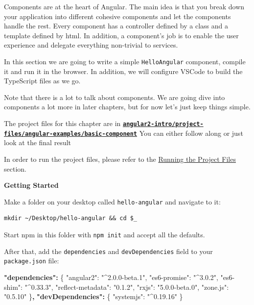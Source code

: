 \documentclass[12pt,]{article}
\newenvironment{Shaded}{}{}
\newcommand{\DataTypeTok}[1]{{#1}}
\newcommand{\StringTok}[1]{\textcolor[rgb]{0.00,0.50,0.50}{{#1}}}
\newcommand{\FunctionTok}[1]{{#1}}
\newcommand{\ErrorTok}[1]{\textcolor[rgb]{1.00,0.00,0.00}{\textbf{{#1}}}}
\begin{document}
Components are at the heart of Angular. The main idea is that you break
down your application into different cohesive components and let the
components handle the rest. Every component has a controller defined by
a class and a template defined by html. In addition, a component's job
is to enable the user experience and delegate everything non-trivial to
services.

In this section we are going to write a simple \texttt{HelloAngular}
component, compile it and run it in the browser. In addition, we will
configure VSCode to build the TypeScript files as we go.

Note that there is a lot to talk about components. We are going dive
into components a lot more in later chapters, but for now let's just
keep things simple.

The project files for this chapter are in
\textbf{\href{https://github.com/st32lth/angular2-intro/tree/master/project-files/angular-examples/basic-component}{\texttt{angular2-intro/project-files/angular-examples/basic-component}}}
You can either follow along or just look at the final result

In order to run the project files, please refer to the
\protect\hyperlink{running-the-project-files}{Running the Project Files}
section.

\textbf{Getting Started}

Make a folder on your desktop called \texttt{hello-angular} and navigate
to it:

\begin{verbatim}
mkdir ~/Desktop/hello-angular && cd $_
\end{verbatim}

Start npm in this folder with \texttt{npm\ init} and accept all the
defaults.

After that, add the \texttt{dependencies} and \texttt{devDependencies}
field to your \texttt{package.json} file:

\begin{Shaded}
\begin{Highlighting}[numbers=left,,]
\ErrorTok{"dependencies":} \FunctionTok{\{}
  \DataTypeTok{"angular2"}\FunctionTok{:} \StringTok{"^2.0.0-beta.1"}\FunctionTok{,}
  \DataTypeTok{"es6-promise"}\FunctionTok{:} \StringTok{"^3.0.2"}\FunctionTok{,}
  \DataTypeTok{"es6-shim"}\FunctionTok{:} \StringTok{"^0.33.3"}\FunctionTok{,}
  \DataTypeTok{"reflect-metadata"}\FunctionTok{:} \StringTok{"0.1.2"}\FunctionTok{,}
  \DataTypeTok{"rxjs"}\FunctionTok{:} \StringTok{"5.0.0-beta.0"}\FunctionTok{,}
  \DataTypeTok{"zone.js"}\FunctionTok{:} \StringTok{"0.5.10"}
\FunctionTok{\}}\ErrorTok{,}
\ErrorTok{"devDependencies":} \FunctionTok{\{}
  \DataTypeTok{"systemjs"}\FunctionTok{:} \StringTok{"^0.19.16"}
\FunctionTok{\}}
\end{Highlighting}
\end{Shaded}
\end{document}
